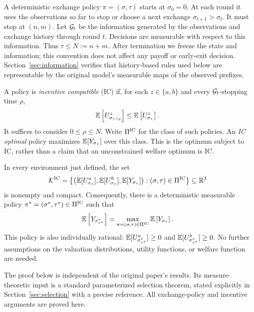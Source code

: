 \documentclass[11pt]{extarticle}
\begin{document}
A deterministic exchange policy $\pi=(\sigma,\tau)$ starts at
$\sigma_0=0$. At each round it uses the observations so far to stop or
choose a next exchange $\sigma_{t+1}>\sigma_t$. It must stop at $(n,m)$.
Let $\mathcal{G}_t$ be the information generated by the observations and exchange
history through round $t$. Decisions are measurable with respect to this
information. Thus $\tau\leq N:=n+m$. After termination we freeze the state
and information; this convention does not affect any payoff or early-exit
decision. Section~\ref{sec:information} verifies that history-based rules
used below are representable by the original model's measurable maps of the
observed prefixes.

A policy is \emph{incentive compatible} (IC) if, for each $z\in\{a,b\}$
and every $\mathcal{G}_t$-stopping time $\rho$,
\begin{equation}
    \mathbb{E}\left[U^z_{\sigma_{\tau\wedge\rho}}\right]
    \leq \mathbb{E}\left[U^z_{\sigma_\tau}\right].
    \label{eq:IC}
\end{equation}
It suffices to consider $0\leq\rho\leq N$.
Write $\Pi^{\text{IC}}$ for the class of such policies.
An \emph{IC optimal} policy maximizes $\mathbb{E}[Y_{\sigma_\tau}]$ over this
class. This is the optimum subject to IC, rather than a claim that an
unconstrained welfare optimum is IC.

\begin{theorem}\label{thm:main}
In every environment just defined, the set
\begin{equation}
    \mathcal{K}^{\mathrm{IC}}
    =\left\{
       \left(\mathbb{E}[U^a_{\sigma_\tau}],
             \mathbb{E}[U^b_{\sigma_\tau}],
             \mathbb{E}[Y_{\sigma_\tau}]\right):
       (\sigma,\tau)\in\Pi^{\text{IC}}
      \right\}
    \subseteq\mathbb{R}^3
    \label{eq:attainable}
\end{equation}
is nonempty and compact. Consequently, there is a deterministic measurable
policy $\pi^*=(\sigma^*,\tau^*)\in\Pi^{\text{IC}}$ such that
\[
    \mathbb{E}\left[Y_{\sigma^*_{\tau^*}}\right]
    =\max_{\pi=(\sigma,\tau)\in\Pi^{\text{IC}}}
      \mathbb{E}\left[Y_{\sigma_\tau}\right].
\]
This policy is also individually rational:
$\mathbb{E}[U^a_{\sigma^*_{\tau^*}}]\geq0$ and
$\mathbb{E}[U^b_{\sigma^*_{\tau^*}}]\geq0$.
No further assumptions on the valuation distributions, utility functions,
or welfare function are needed.
\end{theorem}

The proof below is independent of the original paper's results. Its
measure-theoretic input is a standard parameterized selection theorem,
stated explicitly in Section~\ref{sec:selection} with a precise reference.
All exchange-policy and incentive arguments are proved here.
\end{document}
